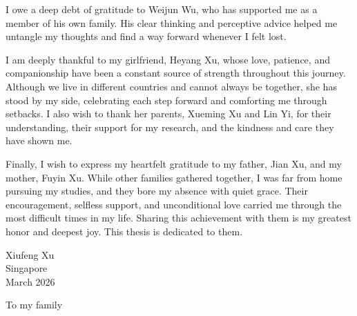 \documentclass[12pt,a4paper]{Thesis} %
\begin{document}
{I owe a deep debt of gratitude to Weijun Wu, who has supported me as a member of his own family. His clear thinking and perceptive advice helped me untangle my thoughts and find a way forward whenever I felt lost.

I am deeply thankful to my girlfriend, Heyang Xu, whose love, patience, and companionship have been a constant source of strength throughout this journey. Although we live in different countries and cannot always be together, she has stood by my side, celebrating each step forward and comforting me through setbacks. I also wish to thank her parents, Xueming Xu and Lin Yi, for their understanding, their support for my research, and the kindness and care they have shown me.

Finally, I wish to express my heartfelt gratitude to my father, Jian Xu, and my mother, Fuyin Xu. While other families gathered together, I was far from home pursuing my studies, and they bore my absence with quiet grace. Their encouragement, selfless support, and unconditional love carried me through the most difficult times in my life. Sharing this achievement with them is my greatest honor and deepest joy. This thesis is dedicated to them.



\begin{flushright}
Xiufeng Xu \\
Singapore \\
March 2026
\end{flushright}
}


\pagestyle{empty} %
%
\null\vfill %

\begin{center}
\large{To my family}
\end{center}
\vfill\vfill\null %
\cleardoublepage %
\end{document}
